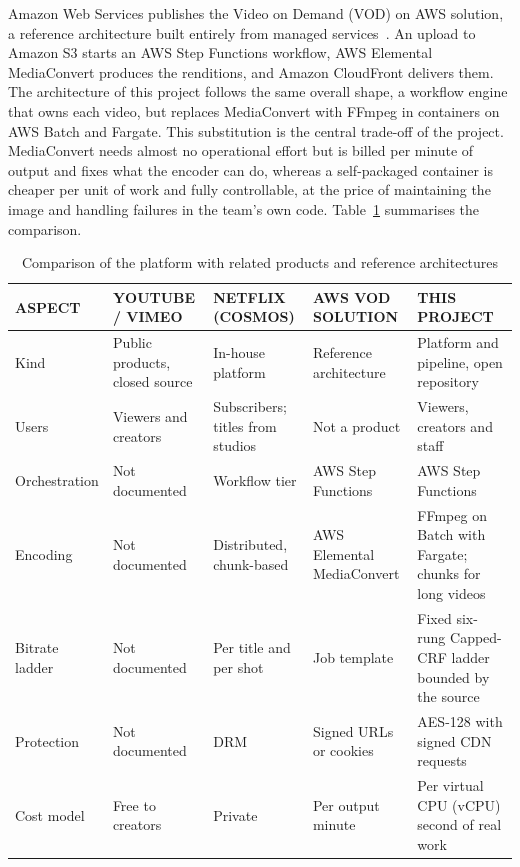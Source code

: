 Amazon Web Services publishes the Video on Demand (VOD) on AWS solution, a reference architecture built
entirely from managed services~\cite{awsvod}. An upload to Amazon S3 starts an AWS Step Functions
workflow, AWS Elemental MediaConvert produces the renditions, and Amazon CloudFront delivers them.
The architecture of this project follows the same overall shape, a workflow engine that owns each
video, but replaces MediaConvert with FFmpeg in containers on AWS Batch and Fargate. This
substitution is the central trade-off of the project. MediaConvert needs almost no operational
effort but is billed per minute of output and fixes what the encoder can do, whereas a
self-packaged container is cheaper per unit of work and fully controllable, at the price of
maintaining the image and handling failures in the team's own code.
Table~\ref{tab:platform-comparison} summarises the comparison.

\begin{table}[H]
\centering
\caption{Comparison of the platform with related products and reference architectures}
\label{tab:platform-comparison}
\small
\begin{tabularx}{\textwidth}{p{} X X X X}
\toprule
\textbf{ASPECT} & \textbf{YOUTUBE / VIMEO} & \textbf{NETFLIX (COSMOS)} & \textbf{AWS VOD SOLUTION} & \textbf{THIS PROJECT} \\
\midrule
Kind & Public products, closed source & In-house platform & Reference architecture & Platform and pipeline, open repository \\
Users & Viewers and creators & Subscribers; titles from studios & Not a product & Viewers, creators and staff \\
Orchestration & Not documented & Workflow tier & AWS Step Functions & AWS Step Functions \\
Encoding & Not documented & Distributed, chunk-based & AWS Elemental MediaConvert & FFmpeg on Batch with Fargate; chunks for long videos \\
Bitrate ladder & Not documented & Per title and per shot & Job template & Fixed six-rung Capped-CRF ladder bounded by the source \\
Protection & Not documented & DRM & Signed URLs or cookies & AES-128 with signed CDN requests \\
Cost model & Free to creators & Private & Per output minute & Per virtual CPU (vCPU) second of real work \\
\bottomrule
\end{tabularx}
\end{table}

